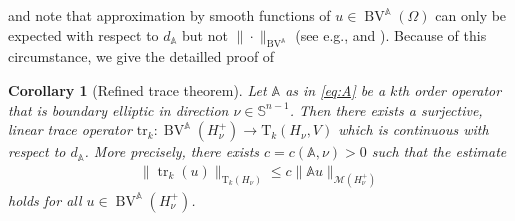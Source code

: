 \documentclass[a4paper,10pt]{amsart}
\renewcommand{\leq}{\leqslant}
\DeclareMathOperator{\tr}{tr}
\newcommand{\bv}{\operatorname{BV}}
\newcommand{\A}{\mathbb{A}}
\numberwithin{equation}{section}
\newtheorem{corollary}[theorem]{Corollary}
\theoremstyle{remark}
\numberwithin{equation}{section}
\begin{document}
	and note that approximation by smooth functions of $u\in\bv^{\A}(\Omega)$ can only be expected with respect to $d_{\A}$ but not $\|\cdot\|_{\bv^{\A}}$ (see e.g., \cite[Sec.~2.4]{BDG} and \cite[Sec.~2.3]{RS}). Because of this circumstance, we give the detailled proof of  
	\begin{corollary}[Refined trace theorem]\label{cor:BVAtrace}
		Let $\A$ as in \eqref{eq:A} be a $k$th order operator that is boundary elliptic in direction $\nu\in\mathbb{S}^{n-1}$. Then there exists a \emph{surjective, linear trace operator} $\mathrm{tr}_{k}\colon\bv^{\A}(H_{\nu}^{+})\to \mathrm{T}_{k}(H_{\nu},V)$ which is \emph{continuous with respect to $d_{\A}$}.
		More precisely, there exists $c=c(\A,\nu)>0$ such that the estimate
		\begin{align}\label{eq:traceestBVA}
			\|\tr_k (u)\|_{\mathrm T_k(H_\nu)}\leq c\|\A u\|_{\mathcal M(H_\nu^+)}
		\end{align}
		holds for all $u\in\bv^\A(H^+_\nu)$.
	\end{corollary} 
\end{document}
